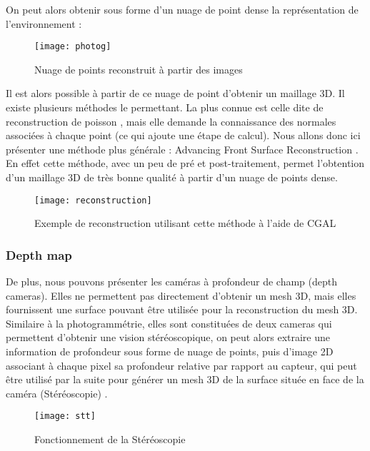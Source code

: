 On peut alors obtenir sous forme d'un nuage de point dense la représentation de l'environnement :

\begin{figure}[h]
    \centering
    \texttt{[image: photog]}
    \caption{Nuage de points reconstruit à partir des images}
    \label{fig:photog}
\end{figure}
\FloatBarrier


Il est alors possible à partir de ce nuage de point d'obtenir un maillage 3D. Il existe plusieurs méthodes le permettant. La plus connue est celle dite de reconstruction de poisson \cite{poisson}, mais elle demande la connaissance des normales associées à chaque point (ce qui ajoute une étape de calcul). Nous allons donc ici présenter une méthode plus générale : Advancing Front Surface Reconstruction \cite{dddddd}. En effet cette méthode, avec un peu de pré et post-traitement, permet l'obtention d'un maillage 3D de très bonne qualité à partir d'un nuage de points dense.

\begin{figure}[h]
    \centering
    \texttt{[image: reconstruction]}
    \caption{Exemple de reconstruction utilisant cette méthode à l'aide de CGAL}
    \label{fig:photog}
\end{figure}
\FloatBarrier


\subsubsection{Depth map} 
De plus, nous pouvons présenter les caméras à profondeur de champ (depth cameras). Elles ne permettent pas directement d'obtenir un mesh 3D, mais elles fournissent une surface pouvant être utilisée pour la reconstruction du mesh 3D. Similaire à la photogrammétrie, elles sont constituées de deux cameras qui permettent d'obtenir une vision stéréoscopique, on peut alors extraire une information de profondeur sous forme de nuage de points, puis d'image 2D associant à chaque pixel sa profondeur relative par rapport au capteur, qui peut être utilisé par la suite pour générer un mesh 3D de la surface située en face de la caméra (Stéréoscopie) \cite{book1} .

\begin{figure}[h]
    \centering
    \texttt{[image: stt]}
    \caption{Fonctionnement de la Stéréoscopie}
    \label{fig:pifuhdWork2}
\end{figure}
\FloatBarrier

